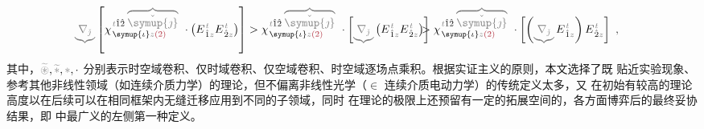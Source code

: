 \begin{subequations}
\begin{align}
	\mathcolor{gray}{\underbrace{\nabla_{\check{\jmath}}}} \left[ \chi^{\;\! \mathcolor{gray}{t} \hat{1} \hat{2} \;\! \mathcolor{gray}{\overbrace{\check{\symup{\jmath}}}}}_{\;\! \symup{\iota} \mathcolor{gray}{z} \textcolor{Maroon}{(2)}} ~\cdot \left( E^{\;\!\mathcolor{gray}{t}}_{\;\! \hat{1} \mathcolor{gray}{z}} E^{\;\!\mathcolor{gray}{t}}_{\;\! \hat{2} \mathcolor{gray}{z}} \right) \right] &> \chi^{\;\! \mathcolor{gray}{t} \hat{1} \hat{2} \;\! \mathcolor{gray}{\overbrace{\check{\symup{\jmath}}}}}_{\;\! \symup{\iota} \mathcolor{gray}{z} \textcolor{Maroon}{(2)}} ~\cdot \left[ \mathcolor{gray}{\underbrace{\nabla_{\check{\jmath}}}} \left( E^{\;\!\mathcolor{gray}{t}}_{\;\! \hat{1} \mathcolor{gray}{z}} E^{\;\!\mathcolor{gray}{t}}_{\;\! \hat{2} \mathcolor{gray}{z}} \right) \right] \hspace{-2em}&&> \chi^{\;\! \mathcolor{gray}{t} \hat{1} \hat{2} \;\! \mathcolor{gray}{\overbrace{\check{\symup{\jmath}}}}}_{\;\! \symup{\iota} \mathcolor{gray}{z} \textcolor{Maroon}{(2)}} ~\cdot \left[ \left( \mathcolor{gray}{\underbrace{\nabla_{\check{\jmath}}}} E^{\;\!\mathcolor{gray}{t}}_{\;\! \hat{1} \mathcolor{gray}{z}} \right) E^{\;\!\mathcolor{gray}{t}}_{\;\! \hat{2} \mathcolor{gray}{z}} \right]~, \label{eq:Volterra-space+time}
\end{align}
\end{subequations}
其中，$\mathcolor{gray}{\widetilde \circledast}, \mathcolor{gray}{\widetilde *}, \mathcolor{gray}{*}, \cdot$ 分别表示时空域卷积、仅时域卷积、仅空域卷积、时空域逐场点乘积。根据实证主义的原则，本文选择了既 {\one} 贴近实验现象、参考其他非线性领域（如连续介质力学）的理论，但不偏离非线性光学（$\in$ 连续介质电动力学）的传统定义太多，又 {\two} 在初始有较高的理论高度以在后续可以在相同框架内无缝迁移应用到不同的子领域，同时 {\three} 在理论的极限上还预留有一定的拓展空间的，各方面博弈后的最终妥协结果，即  中最广义的左侧第一种定义。

